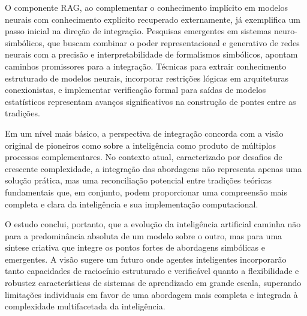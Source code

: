 \documentclass[12pt]{article}
\begin{document}
O componente RAG, ao complementar o conhecimento implícito em modelos neurais com conhecimento explícito recuperado externamente, já exemplifica um passo inicial na direção de integração. Pesquisas emergentes em sistemas neuro-simbólicos, que buscam combinar o poder representacional e generativo de redes neurais com a precisão e interpretabilidade de formalismos simbólicos, apontam caminhos promissores para a integração. Técnicas para extrair conhecimento estruturado de modelos neurais, incorporar restrições lógicas em arquiteturas conexionistas, e implementar verificação formal para saídas de modelos estatísticos representam avanços significativos na construção de pontes entre as tradições.

Em um nível mais básico, a perspectiva de integração concorda com a visão original de pioneiros como \citet{minsky1986} sobre a inteligência como produto de múltiplos processos complementares. No contexto atual, caracterizado por desafios de crescente complexidade, a integração das abordagens não representa apenas uma solução prática, mas uma reconciliação potencial entre tradições teóricas fundamentais que, em conjunto, podem proporcionar uma compreensão mais completa e clara da inteligência e sua implementação computacional.

O estudo conclui, portanto, que a evolução da inteligência artificial caminha não para a predominância absoluta de um modelo sobre o outro, mas para uma síntese criativa que integre os pontos fortes de abordagens simbólicas e emergentes. A visão sugere um futuro onde agentes inteligentes incorporarão tanto capacidades de raciocínio estruturado e verificável quanto a flexibilidade e robustez características de sistemas de aprendizado em grande escala, superando limitações individuais em favor de uma abordagem mais completa e integrada à complexidade multifacetada da inteligência.



\end{document}
